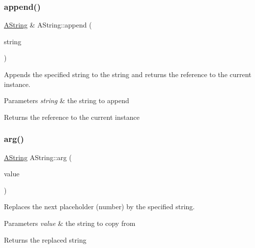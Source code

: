 \subsubsection{\texorpdfstring{append()}{append()}\hspace{0.1cm}{\footnotesize\ttfamily [2/2]}}
{\footnotesize\ttfamily \mbox{\hyperlink{class_a_string}{A\+String}} \& A\+String\+::append (\begin{DoxyParamCaption}\item[{const \mbox{\hyperlink{class_a_string}{A\+String}} \&}]{string }\end{DoxyParamCaption})}



Appends the specified string to the string and returns the reference to the current instance. 


\begin{DoxyParams}{Parameters}
{\em string} & the string to append \\
\hline
\end{DoxyParams}
\begin{DoxyReturn}{Returns}
the reference to the current instance 
\end{DoxyReturn}
\mbox{\label{class_a_string_abe25a22470606db76c275a7d73563bf6}} 
\subsubsection{\texorpdfstring{arg()}{arg()}}
{\footnotesize\ttfamily \mbox{\hyperlink{class_a_string}{A\+String}} A\+String\+::arg (\begin{DoxyParamCaption}\item[{const \mbox{\hyperlink{class_a_string}{A\+String}} \&}]{value }\end{DoxyParamCaption})}



Replaces the next placeholder (number) by the specified string. 


\begin{DoxyParams}{Parameters}
{\em value} & the string to copy from \\
\hline
\end{DoxyParams}
\begin{DoxyReturn}{Returns}
the replaced string 
\end{DoxyReturn}
\mbox{\label{class_a_string_aec4ad61af8cd225bda08719550ec8e72}} 
